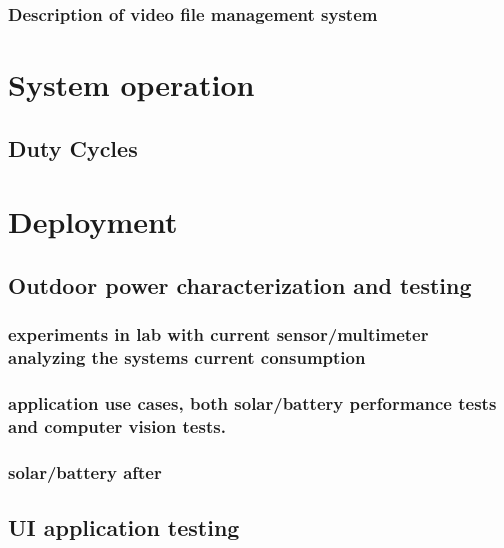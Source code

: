 \documentclass[journal,transmag]{IEEEtran}
\begin{document}
        \subsubsection{Description of video file management system}
        
        




\section{System operation}
	
    \subsection{Duty Cycles}



 
 
 
\section{Deployment} 
	\subsection{ Outdoor power characterization and testing}
    	\subsubsection{experiments in lab with current sensor/multimeter analyzing the systems current consumption}
		
        \subsubsection{application use cases, both solar/battery performance tests and computer vision tests.}
        
		\subsubsection{solar/battery after}
        
    \subsection{ UI application testing}
    
\end{document}
